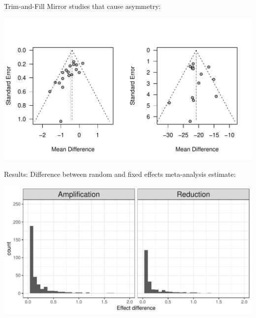 \documentclass[english]{beamer}\usepackage[]{graphicx}\usepackage[]{color}
\makeatletter
\def\maxwidth{ %
  \ifdim\Gin@nat@width>\linewidth
    \linewidth
  \else
    \Gin@nat@width
  \fi
}
\newenvironment{knitrout}{}{} %
\makeatother
\begin{document}
\begin{frame}{Trim-and-Fill}
Mirror studies that cause asymmetry:
\vspace{-1.2cm}

\begin{knitrout}
\color{fgcolor}
\includegraphics[width=\maxwidth]{figure/unnamed-chunk-10-1} 

\end{knitrout}
\end{frame}

\begin{frame}[fragile]{Results:}
Difference between random and fixed effects meta-analysis estimate:

\vspace{-3mm}
\begin{knitrout}
\color{fgcolor}
\includegraphics[width=\maxwidth]{figure/unnamed-chunk-11-1} 

\end{knitrout}
\end{frame}
\end{document}
